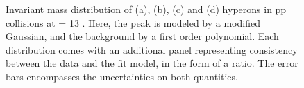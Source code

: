 \begin{figure}[!t]
\hspace*{-1.5cm}
\hspace*{-1.5cm}
\caption{Invariant mass distribution of \rmXiM (a), \rmAxiP (b), \rmOmegaM (c) and \rmAomegaP (d) hyperons in pp collisions at \sqrtS = 13 \tev. Here, the peak is modeled by a modified Gaussian, and the background by a first order polynomial. Each distribution comes with an additional panel representing consistency between the data and the fit model, in the form of a ratio. The error bars encompasses the uncertainties on both quantities.}
	\label{fig:PtSpectra}
\end{figure}


